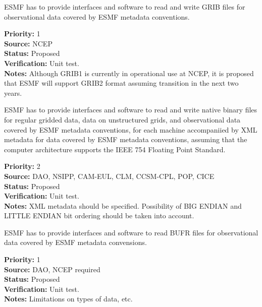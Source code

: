 ESMF has to provide interfaces and software to read and write GRIB
files for observational data covered by ESMF metadata conventions.

\begin{reqlist}
{\bf Priority:} 1 \\
{\bf Source:} NCEP \\
{\bf Status:} Proposed \\
{\bf Verification:} Unit test. \\
{\bf Notes:} Although GRIB1 is currently in operational use at NCEP,
it is proposed that ESMF will support GRIB2 format assuming transition
in the next two years.
\end{reqlist}





ESMF has to provide interfaces and software to read and write native
binary files for regular gridded data, data on unstructured grids, and 
observational data  covered by ESMF metadata conventions, for each machine 
accompaniied by XML metadata for data covered by ESMF metadata conventions,
assuming that the computer architecture supports the IEEE 754 Floating
Point Standard. 

\begin{reqlist}
{\bf Priority:} 2 \\
{\bf Source:} DAO, NSIPP, CAM-EUL, CLM, CCSM-CPL, POP, CICE \\
{\bf Status:} Proposed \\
{\bf Verification:} Unit test. \\
{\bf Notes:} XML metadata should be specified. Possibility of BIG
ENDIAN and LITTLE ENDIAN bit ordering should be taken into account.
\end{reqlist}



ESMF has to provide interfaces and software to read BUFR files for
observational data covered by ESMF metadata convensions.

\begin{reqlist}
{\bf Priority:} 1 \\
{\bf Source:} DAO, NCEP required \\
{\bf Status:} Proposed \\
{\bf Verification:} Unit test. \\
{\bf Notes:} Limitations on types of data, etc.
\end{reqlist}


